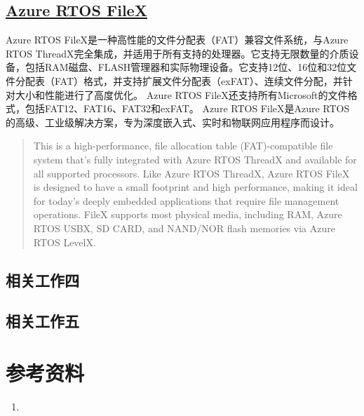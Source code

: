 \documentclass[UTF8,a4paper]{ctexart}
\begin{document}
\subsection{\href{https://github.com/azure-rtos/filex}{Azure RTOS FileX}}
	Azure RTOS FileX是一种高性能的文件分配表（FAT）兼容文件系统，与Azure RTOS ThreadX完全集成，并适用于所有支持的处理器。它支持无限数量的介质设备，包括RAM磁盘、FLASH管理器和实际物理设备。它支持12位、16位和32位文件分配表（FAT）格式，并支持扩展文件分配表（exFAT）、连续文件分配，并针对大小和性能进行了高度优化。
	Azure RTOS FileX还支持所有Microsoft的文件格式，包括FAT12、FAT16、FAT32和exFAT。
	Azure RTOS FileX是Azure RTOS的高级、工业级解决方案，专为深度嵌入式、实时和物联网应用程序而设计。
	\begin{quote}
		This is a high-performance, file allocation table (FAT)-compatible file system that's fully integrated with Azure RTOS ThreadX and available for all supported processors. 
        Like Azure RTOS ThreadX, Azure RTOS FileX is designed to have a small footprint and high performance, making it ideal for today's deeply embedded applications that require file management operations. 
        FileX supports most physical media, including RAM, Azure RTOS USBX, SD CARD, and NAND/NOR flash memories via Azure RTOS LevelX.
	\end{quote}
\subsection{相关工作四}
\subsection{相关工作五}

\section{参考资料}
\begin{enumerate}
    \item 
    
\end{enumerate}
\end{document}
